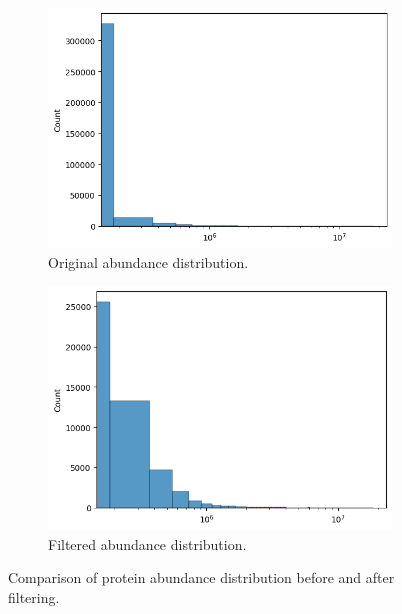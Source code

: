 \documentclass{article}
\begin{document}
      \begin{figure}[H]
        \centering
        \begin{subfigure}{0.45\textwidth}
            \includegraphics[width=\linewidth]{figures/abundance_distribution_before.png}
            \caption{Original abundance distribution.}
            \label{fig:abundance_distribution_before}
        \end{subfigure}
        \hfill
        \begin{subfigure}{0.45\textwidth}
            \includegraphics[width=\linewidth]{figures/abundance_distribution_after.png}
            \caption{Filtered abundance distribution.}
            \label{fig:abundance_distribution_after}
        \end{subfigure}
        \caption{Comparison of protein abundance distribution before and after filtering.}
        \label{fig:abundance_distribution_comparison}
      \end{figure}
      
\end{document}
